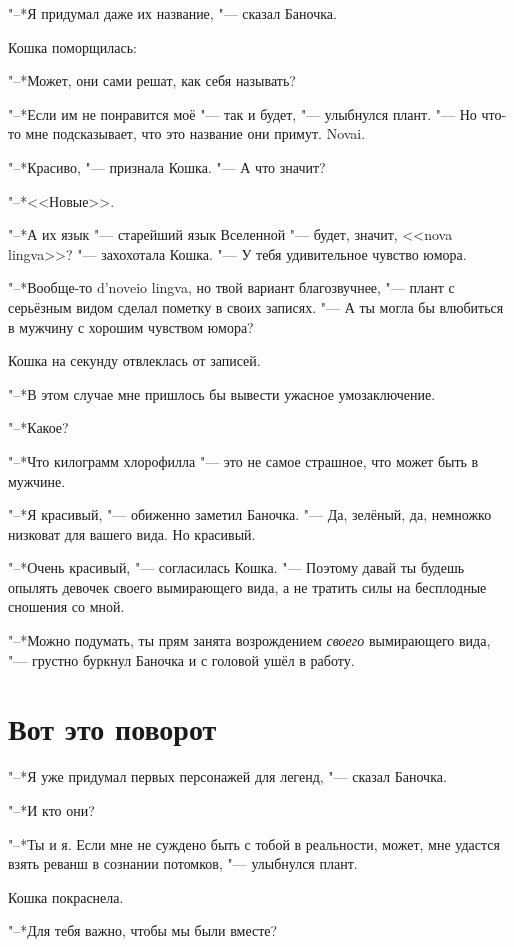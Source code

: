 \documentclass[a4paper,10pt,fleqn]{book}
\begin{document}
"--*Я придумал даже их название, "--- сказал Баночка.

Кошка поморщилась:

"--*Может, они сами решат, как себя называть?

"--*Если им не понравится моё "--- так и будет, "--- улыбнулся плант.
"--- Но что-то мне подсказывает, что это название они примут.
Novai.

"--*Красиво, "--- признала Кошка.
"--- А что значит?

"--*<<Новые>>.

"--*А их язык "--- старейший язык Вселенной "--- будет, значит, <<nova lingva>>? "--- захохотала Кошка.
"--- У тебя удивительное чувство юмора.

"--*Вообще-то d'noveio lingva, но твой вариант благозвучнее, "--- плант с серьёзным видом сделал пометку в своих записях.
"--- А ты могла бы влюбиться в мужчину с хорошим чувством юмора?

Кошка на секунду отвлеклась от записей.

"--*В этом случае мне пришлось бы вывести ужасное умозаключение.

"--*Какое?

"--*Что килограмм хлорофилла "--- это не самое страшное, что может быть в мужчине.

"--*Я красивый, "--- обиженно заметил Баночка.
"--- Да, зелёный, да, немножко низковат для вашего вида.
Но красивый.

"--*Очень красивый, "--- согласилась Кошка.
"--- Поэтому давай ты будешь опылять девочек своего вымирающего вида, а не тратить силы на бесплодные сношения со мной.

"--*Можно подумать, ты прям занята возрождением \textit{своего} вымирающего вида, "--- грустно буркнул Баночка и с головой ушёл в работу.

\section{Вот это поворот}

"--*Я уже придумал первых персонажей для легенд, "--- сказал Баночка.

"--*И кто они?

"--*Ты и я.
Если мне не суждено быть с тобой в реальности, может, мне удастся взять реванш в сознании потомков, "--- улыбнулся плант.

Кошка покраснела.

"--*Для тебя важно, чтобы мы были вместе?
\end{document}
